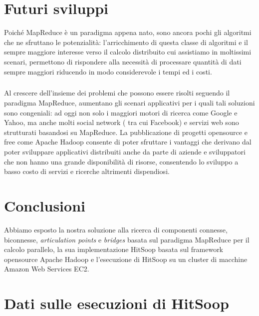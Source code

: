 \documentclass[a4paper,11pt]{report}
\begin{document}
\chapter{Futuri sviluppi}
Poiché MapReduce è un paradigma appena nato, sono ancora pochi gli algoritmi che ne sfruttano le potenzialità: l'arricchimento di questa
classe di algoritmi 
e il sempre maggiore interesse verso il calcolo distribuito cui assistiamo in moltissimi scenari, permettono di rispondere alla necessità di
processare quantità di dati sempre
maggiori riducendo in modo considerevole i tempi ed i costi. 
\paragraph{}
Al crescere dell'insieme dei problemi che possono essere risolti seguendo il paradigma MapReduce, aumentano gli scenari applicativi per i
quali tali soluzioni sono congeniali:
ad oggi non solo i maggiori motori di ricerca come Google e Yahoo, ma anche molti social network ( tra cui Facebook) e servizi web sono
strutturati basandosi su MapReduce.
La pubblicazione di progetti opensource e free come Apache Hadoop consente di poter sfruttare i vantaggi che derivano dal poter sviluppare
applicativi distribuiti anche
da parte di aziende e sviluppatori che non hanno una grande disponibilità di risorse, consentendo lo sviluppo a basso costo di servizi e
ricerche altrimenti dispendiosi. 

\chapter{Conclusioni}
 Abbiamo esposto la nostra soluzione alla ricerca di componenti connesse, biconnesse, \emph{articulation points} e \emph{bridges} basata sul
paradigma MapReduce per il 
calcolo parallelo, la sua implementazione HitSoop basata sul framework opensource Apache Hadoop e l'esecuzione di HitSoop su un cluster di
macchine Amazon Web Services EC2.






\nocite{*}


\appendix

\chapter{Dati sulle esecuzioni di HitSoop}\label{Dati sulle esecuzioni di HitSoop}
\end{document}
